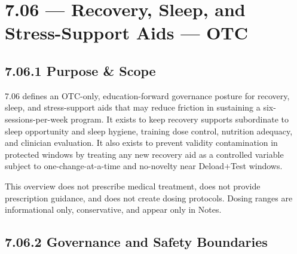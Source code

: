 \documentclass[10pt]{article}
\begin{document}
\section*{7.06 — Recovery, Sleep, and Stress-Support Aids — OTC}
{}

\subsection*{7.06.1 Purpose \& Scope}
{}

7.06 defines an OTC-only, education-forward governance posture for recovery, sleep, and stress-support aids that may reduce friction in sustaining a six-sessions-per-week program. It exists to keep recovery supports subordinate to sleep opportunity and sleep hygiene, training dose control, nutrition adequacy, and clinician evaluation. It also exists to prevent validity contamination in protected windows by treating any new recovery aid as a controlled variable subject to one-change-at-a-time and no-novelty near Deload+Test windows.

This overview does not prescribe medical treatment, does not provide prescription guidance, and does not create dosing protocols. Dosing ranges are informational only, conservative, and appear only in Notes.

\subsection*{7.06.2 Governance and Safety Boundaries}
{}
\end{document}
